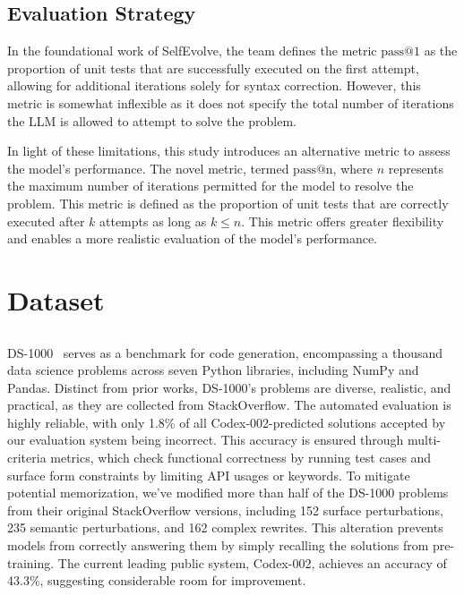 \documentclass[a4paper,oneside]{book}
\begin{document}
\subsection{Evaluation Strategy}
In the foundational work of SelfEvolve, the team defines the metric $\text{pass@1}$ as the proportion of unit tests that are successfully executed on the first attempt, allowing for additional iterations solely for syntax correction. However, this metric is somewhat inflexible as it does not specify the total number of iterations the LLM is allowed to attempt to solve the problem.

In light of these limitations, this study introduces an alternative metric to assess the model's performance. The novel metric, termed $\text{pass@n}$, where $n$ represents the maximum number of iterations permitted for the model to resolve the problem. This metric is defined as the proportion of unit tests that are correctly executed after $k$ attempts as long as $k \leq n$. This metric offers greater flexibility and enables a more realistic evaluation of the model's performance.

\section{Dataset}
\subsection{}
DS-1000~\cite{pmlr-v202-lai23b} serves as a benchmark for code generation, encompassing a thousand data science problems across seven Python libraries, including NumPy and Pandas. Distinct from prior works, DS-1000's problems are diverse, realistic, and practical, as they are collected from StackOverflow. The automated evaluation is highly reliable, with only 1.8\% of all Codex-002-predicted solutions accepted by our evaluation system being incorrect. This accuracy is ensured through multi-criteria metrics, which check functional correctness by running test cases and surface form constraints by limiting API usages or keywords. To mitigate potential memorization, we've modified more than half of the DS-1000 problems from their original StackOverflow versions, including 152 surface perturbations, 235 semantic perturbations, and 162 complex rewrites. This alteration prevents models from correctly answering them by simply recalling the solutions from pre-training. The current leading public system, Codex-002, achieves an accuracy of 43.3\%, suggesting considerable room for improvement.
\end{document}
